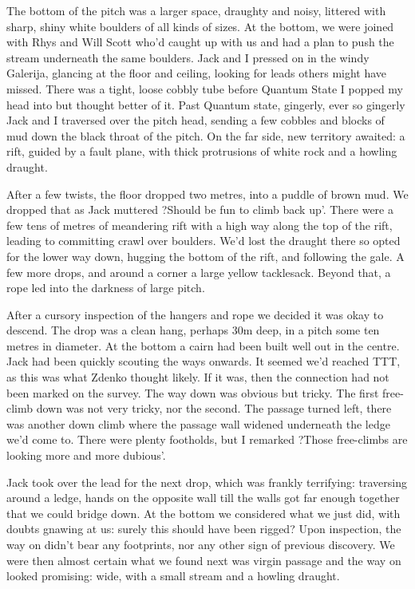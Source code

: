 \documentclass[onecolumn]{book}
\begin{document}
The bottom of the pitch was a larger space, draughty and noisy, littered with sharp, shiny white boulders of all kinds of sizes. At the bottom, we were joined with Rhys and Will Scott who'd caught up with us and had a plan to push the stream underneath the same boulders. Jack and I pressed on in the windy Galerija, glancing at the floor and ceiling, looking for leads others might have missed. There was a tight, loose cobbly tube before Quantum State I popped my head into but thought better of it. Past Quantum state, gingerly, ever so gingerly Jack and I traversed over the pitch head, sending a few cobbles and blocks of mud down the black throat of the pitch. On the far side, new territory awaited: a rift, guided by a fault plane, with thick protrusions of white rock and a howling draught.

After a few twists, the floor dropped two metres, into a puddle of brown mud. We dropped that as Jack muttered ?Should be fun to climb back up'. There were a few tens of metres of meandering rift with a high way along the top of the rift, leading to committing crawl over boulders. We'd lost the draught there so opted for the lower way down, hugging the bottom of the rift, and following the gale. A few more drops, and around a corner a large yellow tacklesack. Beyond that, a rope led into the darkness of large pitch.

After a cursory inspection of the hangers and rope we decided it was okay to descend. The drop was a clean hang, perhaps 30m deep, in a pitch some ten metres in diameter. At the bottom a cairn had been built well out in the centre. Jack had been quickly scouting the ways onwards. It seemed we'd reached TTT, as this was what Zdenko thought likely. If it was, then the connection had not been marked on the survey. The way down was obvious but tricky. The first free-climb down was not very tricky, nor the second. The passage turned left, there was another down climb where the passage wall widened underneath the ledge we'd come to. There were plenty footholds, but I remarked ?Those free-climbs are looking more and more dubious'. 

Jack took over the lead for the next drop, which was frankly terrifying: traversing around a ledge, hands on the opposite wall till the walls got far enough together that we could bridge down. At the bottom we considered what we just did, with doubts gnawing at us: surely this should have been rigged? Upon inspection, the way on didn't bear any footprints, nor any other sign of previous discovery. We were then almost certain what we found next was virgin passage and the way on looked promising: wide, with a small stream and a howling draught.
\end{document}
